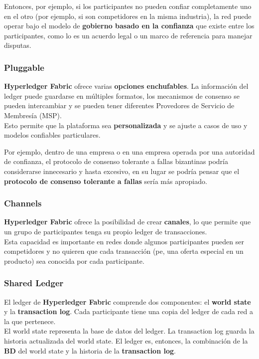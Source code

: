 \documentclass{beamer}
\begin{document}
	\begin{frame}
		Entonces, por ejemplo, si los participantes no pueden confiar completamente uno en el otro (por ejemplo, si son competidores en la misma industria), la red puede operar bajo el modelo de \textbf{gobierno  basado en la confianza} que existe entre los participantes, como lo es un acuerdo legal o un marco de referencia para manejar disputas.
	\end{frame}
	
	\begin{frame}
		\frametitle{Pluggable}
		\textbf{Hyperledger Fabric} ofrece varias \textbf{opciones enchufables}. La información del ledger puede guardarse en múltiples formatos, los mecanismos de consenso se pueden intercambiar y se pueden tener diferentes Provedores de Servicio de Membresía (MSP).\\
		\vspace{4mm}
		Esto permite que la plataforma sea \textbf{personalizada} y se ajuste a casos de uso y modelos confiables particulares.
	\end{frame}

	\begin{frame}	
		Por ejemplo, dentro de una empresa o en una empresa operada por una autoridad de confianza, el protocolo de consenso tolerante a fallas bizantinas podría considerarse innecesario y hasta excesivo, en su lugar se podría pensar que el \textbf{protocolo de consenso tolerante a fallas} sería más apropiado.
	\end{frame}
	
	\begin{frame}
		\frametitle{Channels}
		\textbf{Hyperledger Fabric} ofrece la posibilidad de crear \textbf{canales}, lo que permite que un grupo de participantes tenga su propio ledger de transacciones.\\
		\vspace{4mm}
		Esta capacidad es importante en redes donde algunos participantes pueden ser competidores y no quieren que cada transacción (pe, una oferta especial en un producto) sea conocida por cada participante.
	\end{frame}

	\begin{frame}
		\frametitle{Shared Ledger}
		El ledger de \textbf{Hyperledger Fabric} comprende dos componentes: el \textbf{world state} y la \textbf{transaction log}. Cada participante tiene una copia del ledger de cada red a la que pertenece.\\
		\vspace{4mm}
		El world state representa la base de datos del ledger. La transaction log guarda la historia actualizada del world state. El ledger es, entonces, la combinación de la \textbf{BD} del world state y la historia de la \textbf{transaction log}.
	\end{frame}
	
\end{document}
